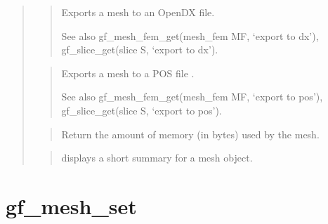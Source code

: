 \documentclass[a4paper,11pt,english]{sphinxmanual}
\begin{document}
\begin{quote}
\begin{quote}
\sphinxAtStartPar
Exports a mesh to an OpenDX file.

\sphinxAtStartPar
See also gf\_mesh\_fem\_get(mesh\_fem MF, ‘export to dx’), gf\_slice\_get(slice S, ‘export to dx’).
\end{quote}

\sphinxAtStartPar
{}
\begin{quote}

\sphinxAtStartPar
Exports a mesh to a POS file .

\sphinxAtStartPar
See also gf\_mesh\_fem\_get(mesh\_fem MF, ‘export to pos’), gf\_slice\_get(slice S, ‘export to pos’).
\end{quote}

\sphinxAtStartPar
{}
\begin{quote}

\sphinxAtStartPar
Return the amount of memory (in bytes) used by the mesh.
\end{quote}

\sphinxAtStartPar
{}
\begin{quote}

\sphinxAtStartPar
displays a short summary for a mesh object.
\end{quote}
\end{quote}


\section{gf\_mesh\_set}
\label{\detokenize{matlab_octave/cmdref_gf_mesh_set:gf-mesh-set}}\label{\detokenize{matlab_octave/cmdref_gf_mesh_set::doc}}
\sphinxAtStartPar
{}
\end{document}
